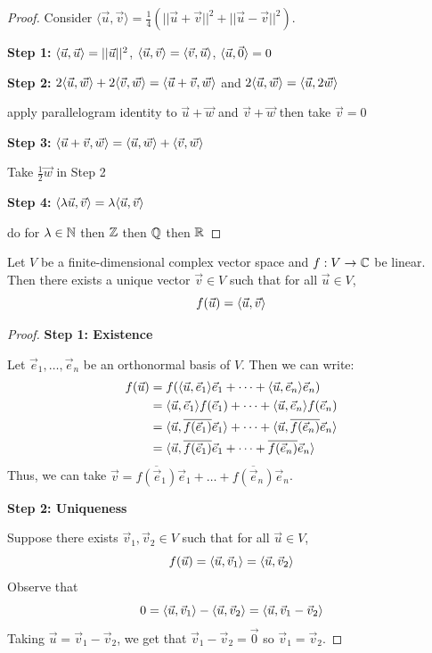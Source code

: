 \begin{proof}
    Consider $\langle\vec{u},\vec{v}\rangle=\frac{1}{4}(||\vec{u}+\vec{v}||^2+||\vec{u}-\vec{v}||^2)$.

    \textbf{Step 1:} $\langle\vec{u},\vec{u}\rangle=||\vec{u}||^2$, $\langle\vec{u},\vec{v}\rangle=\langle\vec{v},\vec{u}\rangle$, $\langle\vec{u},\vec{0}\rangle=0$

    \textbf{Step 2:} $2\langle\vec{u},\vec{w}\rangle+2\langle\vec{v},\vec{w}\rangle=\langle\vec{u}+\vec{v},\vec{w}\rangle$ and $2\langle\vec{u},\vec{w}\rangle=\langle\vec{u},2\vec{w}\rangle$
    
    apply parallelogram identity to $\vec{u}+\vec{w}$ and $\vec{v}+\vec{w}$ then take $\vec{v}=0$

    \textbf{Step 3:} $\langle\vec{u}+\vec{v},\vec{w}\rangle=\langle\vec{u},\vec{w}\rangle+\langle\vec{v},\vec{w}\rangle$

    Take $\frac{1}{2}\vec{w}$ in Step 2

    \textbf{Step 4:} $\langle\lambda\vec{u},\vec{v}\rangle=\lambda\langle\vec{u},\vec{v}\rangle$

    do for $\lambda\in\mathbb{N}$ then $\mathbb{Z}$ then $\mathbb{Q}$ then $\mathbb{R}$
\end{proof}

\begin{theorem}
    Let $V$ be a finite-dimensional complex vector space and $f:V\to\mathbb{C}$ be linear. Then there exists a unique vector $\vec{v}\in V$ such that for all $\vec{u}\in V$,
    \[
    f(\vec{u})=\langle\vec{u},\vec{v}\rangle
    \]
\end{theorem}

\begin{proof}
    \textbf{Step 1: Existence}

    Let $\vec{e}_1,\dots,\vec{e}_n$ be an orthonormal basis of $V$. Then we can write:
    \begin{align*}
        f(\vec{u})&=f(\langle\vec{u},\vec{e}_1\rangle\vec{e}_1 + \dots + \langle\vec{u},\vec{e}_n\rangle\vec{e}_n)\\
        &=\langle\vec{u},\vec{e}_1\rangle f(\vec{e}_1) + \dots + \langle\vec{u},\vec{e}_n\rangle f(\vec{e}_n)\\
        &=\langle\vec{u},\overline{f(\vec{e}_1)}\vec{e}_1\rangle + \dots + \langle\vec{u},\overline{f(\vec{e}_n)}\vec{e}_n\rangle\\
        &=\langle\vec{u},\overline{f(\vec{e}_1)}\vec{e}_1 + \dots + \overline{f(\vec{e}_n)}\vec{e}_n\rangle
    \end{align*}
    Thus, we can take $\vec{v}=\overline{f(\vec{e}_1)}\vec{e}_1 + \dots + \overline{f(\vec{e}_n)}\vec{e}_n$.

    \textbf{Step 2: Uniqueness}

    Suppose there exists $\vec{v}_1,\vec{v}_2\in V$ such that for all $\vec{u}\in V$,
    \[
    f(\vec{u})=\langle\vec{u},\vec{v}_1\rangle=\langle\vec{u},\vec{v}_2\rangle
    \]
    Observe that
    \[
    0 = \langle\vec{u},\vec{v}_1\rangle - \langle\vec{u},\vec{v}_2\rangle = \langle\vec{u},\vec{v}_1 - \vec{v}_2\rangle
    \]
    Taking $\vec{u}=\vec{v}_1-\vec{v}_2$, we get that $\vec{v}_1-\vec{v}_2=\vec{0}$ so $\vec{v}_1=\vec{v}_2$.
\end{proof}

